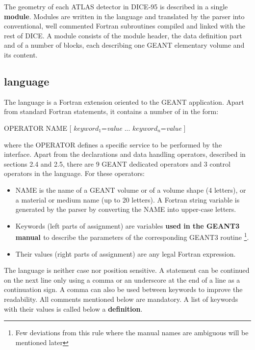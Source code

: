   The geometry of each ATLAS detector in DICE-95 is described 
in a single {\bf module}.
  Modules are written in the \g language and translated by the parser
into conventional, well commented  Fortran subroutines
compiled and linked with the rest of DICE. 
   A  module  consists of the module header,
the data definition part and of a number of blocks, 
each describing one GEANT elementary volume and its content.
 
\subsection{\g language}
 
  The \g language is a Fortran extension oriented to the GEANT application.
Apart from standard Fortran statements, it contains a number of
 in the form:
 
  \begin{center}
      OPERATOR NAME [ $keyword_1$={\it value}  ...  $keyword_n$={\it value} ]
  \end{center}
  where the { OPERATOR } defines a specific service  to be
  performed by the \as interface. 
  Apart from the declarations and data handling operators, 
  described in sections 2.4 and 2.5,
  there are 9 GEANT dedicated operators and 3 control operators 
  in the \g language.
 For these operators:
\begin{itemize}
\item
  NAME is the  name of a GEANT volume or of a volume shape (4 letters),
  or a material or medium name (up to 20 letters). 
  A Fortran string variable is generated by the parser 
  by converting the NAME into
  upper-case letters.
\item
  Keywords (left parts of assignment) are variables
  {\bf  used in the GEANT3 manual \cite{geant} }
  to describe the parameters of the corresponding GEANT3 routine
  \footnote{
    Few deviations from this rule where the manual names
    are ambiguous will be mentioned later}.
\item
  Their values (right parts of assignment) are any legal Fortran expression.
\end{itemize}
 
  The language is neither case nor  position sensitive.
  A \g statement can be continued on the next line only  using  a comma or 
  an  underscore at the end of a line as a continuation sign.
  A comma can also be used between keywords to improve the readability.
  All \g comments mentioned below are mandatory.
  A list of keywords with their values is called below a  {\bf definition}.

